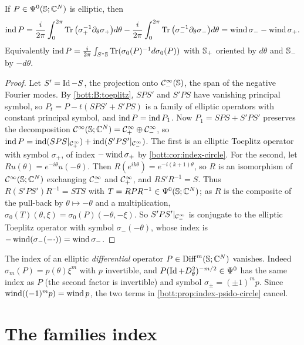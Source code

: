 \begin{proposition}\label{bott:prop:index-psido-circle}
  If $P\in\Psi^{0}(\mathbb{S};\mathbb{C}^N)$ is elliptic, then
  \begin{equation*}
    \operatorname{ind} P=\frac{i}{2\pi}\int_0^{2\pi}\operatorname{Tr}\big(\sigma_+^{-1}\partial_\theta\sigma_+\big)d\theta
    -\frac{i}{2\pi}\int_0^{2\pi}\operatorname{Tr}\big(\sigma_-^{-1}\partial_\theta\sigma_-\big)d\theta
    =\operatorname{wind}\sigma_--\operatorname{wind}\sigma_+ .
  \end{equation*}
  Equivalently $\operatorname{ind} P=\frac{i}{2\pi}\int_{S^*\mathbb{S}}\operatorname{Tr}(\sigma_0(P)^{-1}d\sigma_0(P))$
  with $\mathbb{S}_+$ oriented by $d\theta$ and $\mathbb{S}_-$ by $-d\theta$.
\end{proposition}
\begin{proof}
  Let $S'=\operatorname{Id}-S$, the projection onto $\mathcal{C}^\infty_-(\mathbb{S})$, the span of the negative
  Fourier modes. By \ref{bott:B:toeplitz}, $SPS'$ and $S'PS$ have vanishing principal
  symbol, so $P_t=P-t(SPS'+S'PS)$ is a family of elliptic operators with constant
  principal symbol, and $\operatorname{ind} P=\operatorname{ind} P_1$. Now $P_1=SPS+S'PS'$ preserves the
  decomposition $\mathcal{C}^\infty(\mathbb{S};\mathbb{C}^N)=\mathcal{C}^\infty_+\oplus\mathcal{C}^\infty_-$, so
  $\operatorname{ind} P=\operatorname{ind}(SPS|_{\mathcal{C}^\infty_+})+\operatorname{ind}(S'PS'|_{\mathcal{C}^\infty_-})$. The first is an elliptic Toeplitz
  operator with symbol $\sigma_+$, of index $-\operatorname{wind}\sigma_+$ by
  \cref{bott:cor:index-circle}. For the second, let $Ru(\theta)=e^{-i\theta}u(-\theta)$.
  Then $R(e^{ik\theta})=e^{-i(k+1)\theta}$, so $R$ is an isomorphism of $\mathcal{C}^\infty(\mathbb{S};\mathbb{C}^N)$
  exchanging $\mathcal{C}^\infty_-$ and $\mathcal{C}^\infty_+$, and $RS'R^{-1}=S$. Thus $R(S'PS')R^{-1}=STS$ with
  $T=RPR^{-1}\in\Psi^{0}(\mathbb{S};\mathbb{C}^N)$; as $R$ is the composite of the pull-back by
  $\theta\mapsto-\theta$ and a multiplication, $\sigma_0(T)(\theta,\xi)=\sigma_0(P)(-\theta,-\xi)$.
  So $S'PS'|_{\mathcal{C}^\infty_-}$ is conjugate to the elliptic Toeplitz operator with symbol
  $\sigma_-(-\theta)$, whose index is $-\operatorname{wind}(\sigma_-(-\cdot))=\operatorname{wind}\sigma_-$.
\end{proof}

\begin{remark}
  The index of an elliptic \emph{differential} operator $P\in\operatorname{Diff}^{m}(\mathbb{S};\mathbb{C}^N)$
  vanishes. Indeed $\sigma_m(P)=p(\theta)\xi^m$ with $p$ invertible, and
  $P(\operatorname{Id}+D_\theta^2)^{-m/2}\in\Psi^{0}$ has the same index as $P$ (the second factor
  is invertible) and symbol $\sigma_\pm=(\pm1)^mp$. Since $\operatorname{wind}((-1)^mp)=\operatorname{wind} p$,
  the two terms in \cref{bott:prop:index-psido-circle} cancel.
\end{remark}

\section{The families index}\label{bott:sec:families}

